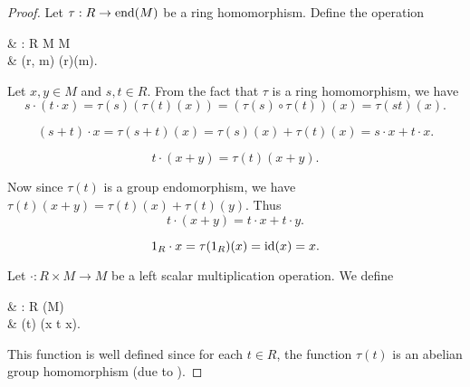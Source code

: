 \begin{proof}
   Let \( \tau: R \to \operatorname{end}(M) \) be a ring homomorphism. Define the operation
  \begin{balign*}
     & \cdot: R \times M \to M           \\
     & \cdot(r, m) \coloneqq \tau(r)(m).
  \end{balign*}

  Let \( x, y \in M \) and \( s, t \in R \). From the fact that \( \tau \) is a ring homomorphism, we have
  \begin{equation*}
    s \cdot (t \cdot x)
    =
    \tau(s)(\tau(t)(x))
    =
    (\tau(s) \circ \tau(t))(x)
    =
    \tau(st)(x).
  \end{equation*}

  \begin{equation*}
    (s + t) \cdot x
    =
    \tau(s + t)(x)
    =
    \tau(s)(x) + \tau(t)(x)
    =
    s \cdot x + t \cdot x.
  \end{equation*}

  \begin{equation*}
    t \cdot (x + y)
    =
    \tau(t)(x + y).
  \end{equation*}

  Now since \( \tau(t) \) is a group endomorphism, we have \( \tau(t)(x + y) = \tau(t)(x) + \tau(t)(y) \). Thus
  \begin{equation*}
    t \cdot (x + y)
    =
    t \cdot x + t \cdot y.
  \end{equation*}

  \begin{equation*}
    1_R \cdot x
    =
    \tau(1_R)(x)
    =
    \operatorname{id}(x)
    =
    x.
  \end{equation*}

   Let \( \cdot: R \times M \to M \) be a left scalar multiplication operation. We define
  \begin{balign*}
     & \tau: R \to \End(M)                      \\
     & \tau(t) \coloneqq (x \mapsto t \cdot x).
  \end{balign*}

  This function is well defined since for each \( t \in R \), the function \( \tau(t) \) is an abelian group homomorphism (due to ).


\end{proof}
